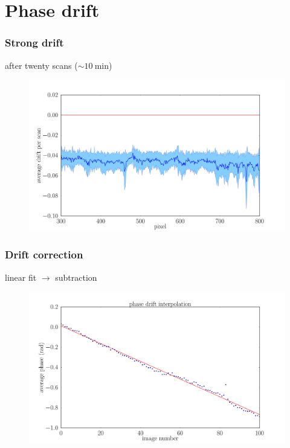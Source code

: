 \documentclass[first,firstsupp]{ETHclass}
\begin{document}
    \section{Phase drift}
    \begin{frame}
        \frametitle{Strong drift}
        after twenty scans ($\sim\SI{10}{\minute}$)
        \begin{figure}[h]
            \centering
            \includegraphics[height=.65\textheight]{drift_pixels.pdf}
        \end{figure}
    \end{frame}
    \begin{frame}
        \frametitle{Drift correction}
        linear fit $\rightarrow$ subtraction
        \begin{figure}[h]
            \centering
            \includegraphics[height=.65\textheight]{drift_fit.pdf}
        \end{figure}
    \end{frame}
\end{document}
